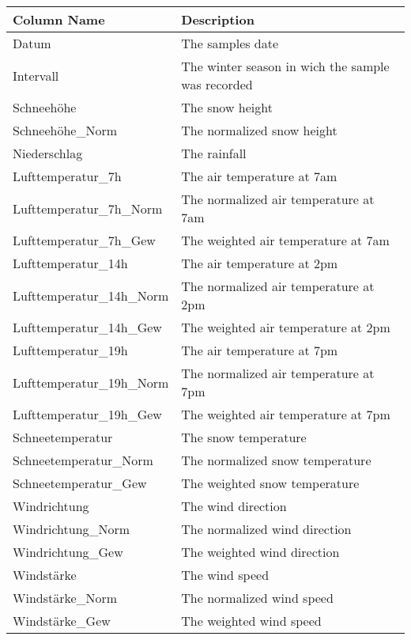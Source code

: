\documentclass[../masterarbeit.tex]{subfiles}
\begin{document}
\begin{table}
    \centering
    \begin{tabular}{|l|l|}
    \hline
        Column Name & Description \\ \hline
        Datum & The samples date \\ \hline
        Intervall & The winter season in wich the sample was recorded \\ \hline
        Schneehöhe & The snow height \\ \hline
        Schneehöhe\_Norm & The normalized snow height \\ \hline
        Niederschlag & The rainfall \\ \hline
        Lufttemperatur\_7h & The air temperature at 7am \\ \hline
        Lufttemperatur\_7h\_Norm & The normalized air temperature at 7am \\ \hline
        Lufttemperatur\_7h\_Gew & The weighted air temperature at 7am \\ \hline
        Lufttemperatur\_14h & The air temperature at 2pm \\ \hline
        Lufttemperatur\_14h\_Norm & The normalized air temperature at 2pm \\ \hline
        Lufttemperatur\_14h\_Gew & The weighted air temperature at 2pm \\ \hline
        Lufttemperatur\_19h & The air temperature at 7pm \\ \hline
        Lufttemperatur\_19h\_Norm & The normalized air temperature at 7pm \\ \hline
        Lufttemperatur\_19h\_Gew & The weighted air temperature at 7pm \\ \hline
        Schneetemperatur & The snow temperature \\ \hline
        Schneetemperatur\_Norm & The normalized snow temperature \\ \hline
        Schneetemperatur\_Gew & The weighted snow temperature \\ \hline
        Windrichtung & The wind direction \\ \hline
        Windrichtung\_Norm & The normalized wind direction \\ \hline
        Windrichtung\_Gew & The weighted wind direction \\ \hline
        Windstärke & The wind speed \\ \hline
        Windstärke\_Norm & The normalized wind speed \\ \hline
        Windstärke\_Gew & The weighted wind speed \\ \hline

\end{tabular}
\end{table}
\end{document}
